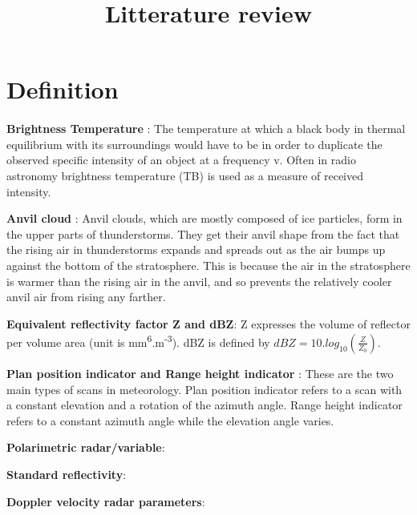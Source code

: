 \documentclass[12pt]{article}
\begin{document}
\title{Litterature review}
\maketitle

\section{Definition}

\paragraph{}
\textbf{Brightness Temperature} : The temperature at which a black body in thermal equilibrium with its surroundings would have to be in order to duplicate the observed specific intensity of an object at a frequency v. Often in radio astronomy brightness temperature (TB) is used as a measure of received intensity.

\vspace{0.5cm}

\textbf{Anvil cloud} : Anvil clouds, which are mostly composed of ice particles, form in the upper parts of thunderstorms. They get their anvil shape from the fact that the rising air in thunderstorms expands and spreads out as the air bumps up against the bottom of the stratosphere. This is because the air in the stratosphere is warmer than the rising air in the anvil, and so prevents the relatively cooler anvil air from rising any farther.

\vspace{0.5cm} 
\textbf{Equivalent reflectivity factor Z and dBZ}: Z expresses the volume of reflector per volume area (unit is mm\textsuperscript{6}.m\textsuperscript{-3}). dBZ is defined by $dBZ= 10.log_{10}(\frac{Z}{Z_{0}})$.

\vspace{0.5cm}
\textbf{Plan position indicator and Range height indicator} : These are the two main types of scans in meteorology. Plan position indicator refers to a scan with a constant elevation and a rotation of the azimuth angle. Range height indicator refers to a constant azimuth angle while the elevation angle varies.  

\vspace{0.5cm}
\textbf{Polarimetric radar/variable}:

\vspace{0.5cm}
\textbf{Standard reflectivity}:

\vspace{0.5cm}
\textbf{Doppler velocity radar parameters}:
\end{document}

